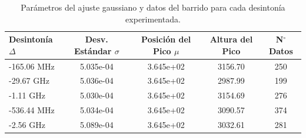 \begin{table}[htbp]
\centering
\caption{Parámetros del ajuste gaussiano y datos del barrido para cada desintonía experimentada.}
\label{tab:ajuste_deltas}
\begin{tabular}{lcccc}
\hline
\hline
Desintonía $\Delta$ & Desv. Estándar $\sigma$ & Posición del Pico $\mu$ & Altura del Pico & N$^\circ$ Datos \\
\hline
-165.06 MHz & 5.035e-04 & 3.645e+02 & 3156.70 & 250 \\
-29.67 GHz & 5.036e-04 & 3.645e+02 & 2987.99 & 199 \\
-1.11 GHz & 5.030e-04 & 3.645e+02 & 3154.69 & 276 \\
-536.44 MHz & 5.034e-04 & 3.645e+02 & 3090.57 & 374 \\
-2.56 GHz & 5.089e-04 & 3.645e+02 & 3032.61 & 281 \\
\hline
\hline
\end{tabular}
\end{table}
